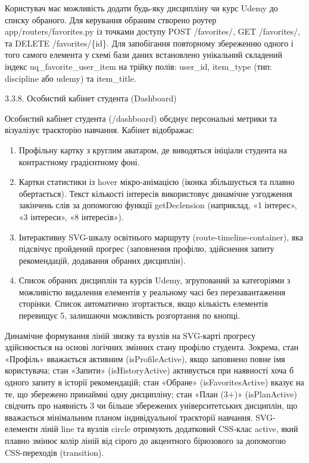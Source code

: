 \documentclass[
]{article}
\begin{document}
Користувач має можливість додати будь-яку дисципліну чи курс Udemy до
списку обраного. Для керування обраним створено роутер
app/routers/favorites.py із точками доступу POST /favorites/, GET
/favorites/, та DELETE /favorites/\{id\}. Для запобігання повторному
збереженню одного і того самого елемента у схемі бази даних встановлено
унікальний складений індекс uq\_favorite\_user\_item на трійку полів:
user\_id, item\_type (тип: discipline або udemy) та item\_title.

3.3.8. Особистий кабінет студента (Dashboard)

Особистий кабінет студента (/dashboard) об\textquotesingle єднує
персональні метрики та візуалізує траєкторію навчання. Кабінет
відображає:

\begin{enumerate}
\def\labelenumi{\arabic{enumi}.}
\item
  Профільну картку з круглим аватаром, де виводяться ініціали студента
  на контрастному градієнтному фоні.
\item
  Картки статистики із hover мікро-анімацією (іконка збільшується та
  плавно обертається). Текст кількості інтересів використовує динамічне
  узгодження закінчень слів за допомогою функції getDeclension
  (наприклад, «1 інтерес», «3 інтереси», «8 інтересів»).
\item
  Інтерактивну SVG-шкалу освітнього маршруту (route-timeline-container),
  яка підсвічує пройдений прогрес (заповнення профілю, здійснення запиту
  рекомендацій, додавання обраних дисциплін).
\item
  Список обраних дисциплін та курсів Udemy, згрупований за категоріями з
  можливістю видалення елементів у реальному часі без перезавантаження
  сторінки. Список автоматично згортається, якщо кількість елементів
  перевищує 5, залишаючи можливість розгортання по кнопці.
\end{enumerate}

Динамічне формування ліній зв\textquotesingle язку та вузлів на
SVG-карті прогресу здійснюється на основі логічних змінних стану профілю
студента. Зокрема, стан «Профіль» вважається активним (isProfileActive),
якщо заповнено повне ім\textquotesingle я користувача; стан «Запити»
(isHistoryActive) активується при наявності хоча б одного запиту в
історії рекомендацій; стан «Обране» (isFavoritesActive) вказує на те, що
збережено принаймні одну дисципліну; стан «План (3+)» (isPlanActive)
свідчить про наявність 3 чи більше збережених університетських
дисциплін, що вважається мінімальним планом індивідуальної траєкторії
навчання. SVG-елементи ліній line та вузлів circle отримують додатковий
CSS-клас active, який плавно змінює колір ліній від сірого до акцентного
бірюзового за допомогою CSS-переходів (transition).
\end{document}
